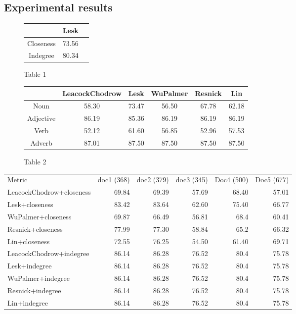 \documentclass[12pt,letterpaper]{article}
\newcommand{\blue}[1]{\textcolor{RoyalBlue}{#1}}
\newcommand{\instructions}[1]{\blue{\textit{#1}}}
\begin{document}
\subsection{Experimental results}
\label{sec:experimental-results}
\begin{figure}
\centering
\begin{minipage}{.5\linewidth}
\begin{tabular}{|c|c|c|}
  & Lesk  \\
\hline
Closeness & 73.56 \\
Indegree & 80.34 \\
\end{tabular}
\caption{Table 1}
\end{minipage}
\quad
\begin{tabular}{|c|c|c|c|c|c|}
 & LeacockChodrow & Lesk & WuPalmer & Resnick & Lin  \\
\hline
Noun & 58.30 & 73.47 & 56.50& 67.78 & 62.18\\
Adjective & 86.19 & 85.36 & 86.19 & 86.19 & 86.19\\
Verb & 52.12 & 61.60 & 56.85 & 52.96 & 57.53\\
Adverb & 87.01 & 87.50 & 87.50 & 87.50 & 87.50\\
\end{tabular}
\caption{Table 2}
\end{figure}
\begin{tabular}{lrrrrr}
Metric & doc1 (368) & doc2 (379) & doc3 (345) & Doc4 (500) & Doc5 (677) \\
LeacockChodrow+closeness & 69.84 & 69.39 & 57.69 & 68.40 & 57.01 \\
Lesk+closeness & 83.42 & 83.64 & 62.60 & 75.40 & 66.77 \\
WuPalmer+closeness & 69.87 & 66.49 & 56.81 & 68.4 & 60.41 \\
Resnick+closeness & 77.99 & 77.30 & 58.84 & 65.2 & 66.32 \\
Lin+closeness & 72.55 & 76.25 & 54.50 & 61.40 & 69.71 \\
LeacockChodrow+indegree & 86.14 & 86.28 & 76.52 & 80.4 & 75.78 \\
Lesk+indegree & 86.14 & 86.28 & 76.52 & 80.4 & 75.78 \\
WuPalmer+indegree & 86.14 & 86.28 & 76.52 & 80.4 & 75.78 \\
Resnick+indegree & 86.14 & 86.28 & 76.52 & 80.4 & 75.78 \\
Lin+indegree & 86.14 & 86.28 & 76.52 & 80.4 & 75.78 \\
\end{tabular}
\end{document}
